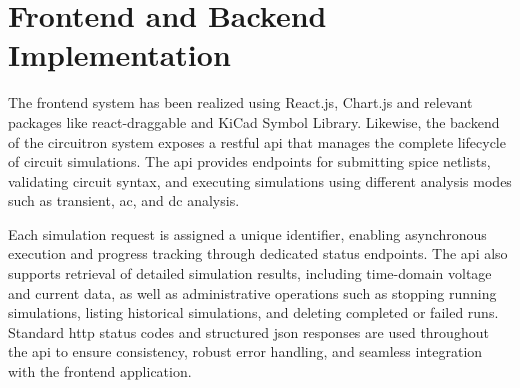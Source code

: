 \section{Frontend and Backend Implementation}

The frontend system has been realized using React.js, Chart.js and relevant packages like react-draggable and KiCad Symbol Library. Likewise, the backend of the \gls{circuitron} system exposes a \gls{restful} \gls{api} that manages the complete lifecycle of circuit simulations. The \gls{api} provides endpoints for submitting \gls{spice} netlists, validating circuit syntax, and executing simulations using different analysis modes such as transient, \gls{ac}, and \gls{dc} analysis. 

Each simulation request is assigned a unique identifier, enabling asynchronous execution and progress tracking through dedicated status endpoints. The \gls{api} also supports retrieval of detailed simulation results, including time-domain voltage and current data, as well as administrative operations such as stopping running simulations, listing historical simulations, and deleting completed or failed runs. Standard \gls{http} status codes and structured \gls{json} responses are used throughout the \gls{api} to ensure consistency, robust error handling, and seamless integration with the frontend application.



